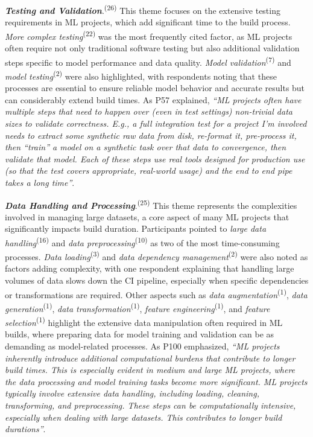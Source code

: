 \textit{\textbf{Testing and Validation}}.\textsuperscript{(26)} This theme focuses on the extensive testing requirements in ML projects, which add significant time to the build process. \textit{More complex testing}\textsuperscript{(22)} was the most frequently cited factor, as ML projects often require not only traditional software testing but also additional validation steps specific to model performance and data quality. 
\textit{Model validation}\textsuperscript{(7)} and \textit{model testing}\textsuperscript{(2)} were also highlighted, with respondents noting that these processes are essential to ensure reliable model behavior and accurate results but can considerably extend build times. As P57 explained, \textit{``ML projects often have multiple steps that need to happen over (even in test settings) non-trivial data sizes to validate correctness. E.g., a full integration test for a project I'm involved needs to extract some synthetic raw data from disk, re-format it, pre-process it, then ``train'' a model on a synthetic task over that data to convergence, then validate that model. Each of these steps use real tools designed for production use (so that the test covers appropriate, real-world usage) and the end to end pipe takes a long time''}.

\textit{\textbf{Data Handling and Processing}}.\textsuperscript{(25)} This theme represents the complexities involved in managing large datasets, a core aspect of many ML projects that significantly impacts build duration. Participants pointed to \textit{large data handling}\textsuperscript{(16)} and \textit{data preprocessing}\textsuperscript{(10)} as two of the most time-consuming processes. \textit{Data loading}\textsuperscript{(3)} and \textit{data dependency management}\textsuperscript{(2)} were also noted as factors adding complexity, with one respondent explaining that handling large volumes of data slows down the CI pipeline, especially when specific dependencies or transformations are required. Other aspects such as \textit{data augmentation}\textsuperscript{(1)}, \textit{data generation}\textsuperscript{(1)}, \textit{data transformation}\textsuperscript{(1)}, \textit{feature engineering}\textsuperscript{(1)}, and \textit{feature selection}\textsuperscript{(1)} highlight the extensive data manipulation often required in ML builds, where preparing data for model training and validation can be as demanding as model-related processes. As P100 emphasized,
\textit{``ML projects inherently introduce additional computational burdens that contribute to longer build times. This is especially evident in medium and large ML projects, where the data processing and model training tasks become more significant. ML projects typically involve extensive data handling, including loading, cleaning, transforming, and preprocessing. These steps can be computationally intensive, especially when dealing with large datasets. This contributes to longer build durations''}.


